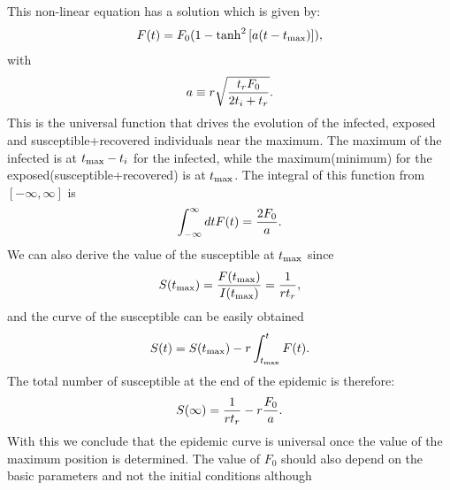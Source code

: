 \documentclass[a4paper,oneside,11pt]{article}
\begin{document}
 This non-linear equation has a solution which is given by:
\begin{eqnarray}
F(t) = F_0 \large(1 - \tanh^2\left[ a (t-t_{\rm max})\right]\large),
\label{eq:tanh}
\end{eqnarray} 
with 
\begin{eqnarray}
a\equiv r \sqrt{{t_r F_0\over 2 t_i+t_r}}.
\end{eqnarray}
This is the universal function that drives the evolution of the infected, exposed and susceptible+recovered individuals near the maximum. The maximum of the infected is at $t_{\rm max}-t_i$ for the infected, while the maximum(minimum) for the exposed(susceptible+recovered) is at $t_{\rm max}$. The integral of this function from $[-\infty, \infty]$ is
\begin{eqnarray}
\int_{-\infty}^{\infty} dt F(t) = {2 F_0 \over a}.
\end{eqnarray}
We can also derive the value of the susceptible at $t_{\rm max}$ since
\begin{eqnarray}
S(t_{\rm max}) = {F(t_{\rm max}) \over I(t_{\rm max})} = {1  \over r t_r},
\end{eqnarray}
and the curve of the susceptible can be easily obtained 
\begin{eqnarray}
S(t) = S(t_{\rm max}) - r \int_{t_{\rm max}}^t F(t).
\end{eqnarray}
The total number of susceptible at the end of the epidemic is therefore:
\begin{eqnarray}
S(\infty) = {1\over r t_r } - r {F_0\over a}.
\end{eqnarray}
With this we conclude that the epidemic curve is universal once the value of the maximum position is determined. The value of $F_0$ should also 
depend on the basic parameters and not the initial conditions although 
\end{document}
